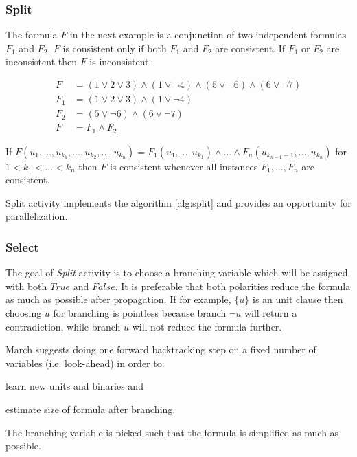 \subsubsection{Split}

The formula $F$ in the next example is a conjunction of two
independent formulas $F_1$ and $F_2$. $F$ is consistent only if both
$F_1$ and $F_2$ are consistent. If $F_1$ or $F_2$ are inconsistent
then $F$ is inconsistent.

\begin{align}
  F &= (1 \lor 2 \lor 3) \land (1 \lor \neg 4) \land (5 \lor \neg 6) \land (6 \lor \neg 7) \\
  F_1 &= (1 \lor 2 \lor 3) \land (1 \lor \neg 4) \\
  F_2 &= (5 \lor \neg 6) \land (6 \lor \neg 7) \\
  F &= F_1 \land F_2
\end{align}

\begin{myprop}
  If $F(u_1, \ldots, u_{k_1}, \ldots, u_{k_2}, \ldots, u_{k_n}) =
  F_1(u_1, \ldots, u_{k_1}) \land \ldots \land F_n(u_{k_{n-1}+1},
  \ldots, u_{k_n})$ for $1 < k_1 < \ldots <k_n$ then $F$
  is consistent whenever all instances $F_1, \ldots, F_n$
  are consistent.
\end{myprop}

Split activity implements the algorithm \ref{alg:split} and provides
an opportunity for parallelization.


\subsubsection{Select}
\label{ssec:branching}

The goal of \emph{Split} activity is to choose a branching variable
which will be assigned with both $True$ and $False$. It is preferable
that both polarities reduce the formula as much as possible after
propagation.  If for example, $\{ u \}$ is an unit clause then
choosing $u$ for branching is pointless because branch $\neg u$
will return a contradiction, while branch $u$ will not reduce the
formula further.

March \cite{mine:march} suggests doing one forward backtracking
step on a fixed number of variables (i.e. look-ahead) in order to:
\begin{inparaenum}[a)]
  \item learn new units and binaries and
  \item estimate size of formula after branching.
\end{inparaenum} The branching variable is picked such that
the formula is simplified as much as possible.

